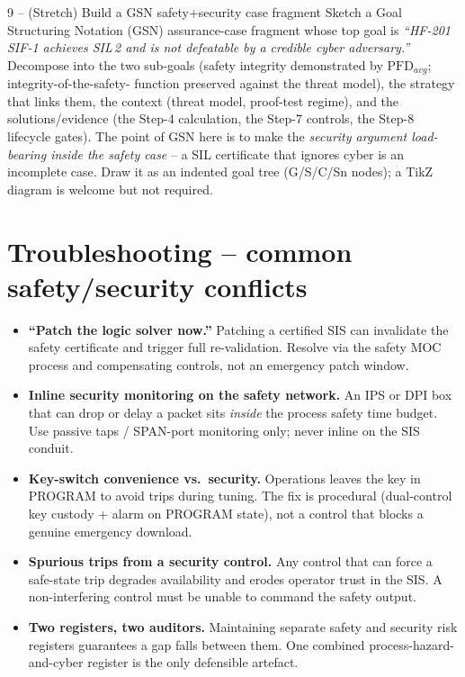 \documentclass[11pt,a4paper]{article}
\begin{document}
\begin{stepbox}{9 -- (Stretch) Build a GSN safety+security case fragment}
Sketch a Goal Structuring Notation (GSN) assurance-case fragment whose top
goal is \emph{``HF-201 SIF-1 achieves SIL\,2 and is not defeatable by a
credible cyber adversary.''} Decompose into the two sub-goals (safety
integrity demonstrated by $\mathrm{PFD}_{avg}$; integrity-of-the-safety-
function preserved against the threat model), the strategy that links them,
the context (threat model, proof-test regime), and the solutions/evidence
(the Step-4 calculation, the Step-7 controls, the Step-8 lifecycle gates).
The point of GSN here is to make the \emph{security argument load-bearing
inside the safety case} -- a SIL certificate that ignores cyber is an
incomplete case. Draw it as an indented goal tree (G/S/C/Sn nodes); a TikZ
diagram is welcome but not required.
\end{stepbox}

\section*{Troubleshooting -- common safety/security conflicts}

\begin{notebox}
\begin{itemize}[leftmargin=1.4em]\setlength{\itemsep}{2pt}
  \item \textbf{``Patch the logic solver now.''} Patching a certified SIS can
        invalidate the safety certificate and trigger full re-validation.
        Resolve via the safety MOC process and compensating controls, not an
        emergency patch window.
  \item \textbf{Inline security monitoring on the safety network.} An IPS or
        DPI box that can drop or delay a packet sits \emph{inside} the process
        safety time budget. Use passive taps / SPAN-port monitoring only;
        never inline on the SIS conduit.
  \item \textbf{Key-switch convenience vs.\ security.} Operations leaves the
        key in PROGRAM to avoid trips during tuning. The fix is procedural
        (dual-control key custody + alarm on PROGRAM state), not a control
        that blocks a genuine emergency download.
  \item \textbf{Spurious trips from a security control.} Any control that can
        force a safe-state trip degrades availability and erodes operator
        trust in the SIS. A non-interfering control must be unable to command
        the safety output.
  \item \textbf{Two registers, two auditors.} Maintaining separate safety and
        security risk registers guarantees a gap falls between them. One
        combined process-hazard-and-cyber register is the only defensible
        artefact.
\end{itemize}
\end{notebox}
\end{document}
